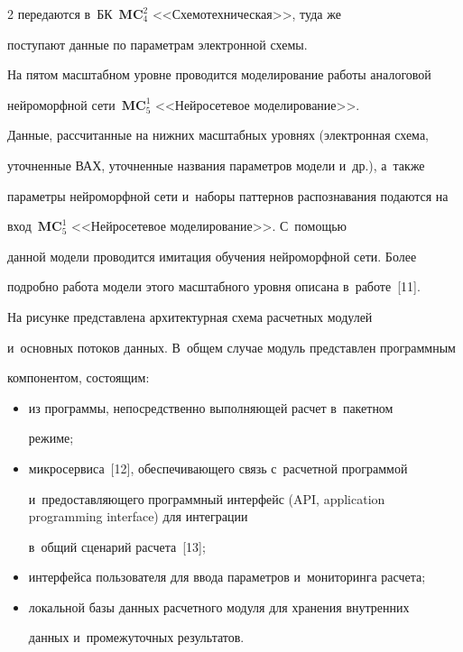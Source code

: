 \begin{multicols}{2}
передаются в~БК~$\mathbf{MC}_4^2$ <<Схемотехническая>>, туда же 


по\-сту\-па\-ют данные по па\-ра\-мет\-рам электронной схемы.


     


     На пятом масштабном уровне проводится моделирование работы аналоговой 


нейроморфной сети~$\mathbf{MC}_5^1$ <<Нейросетевое моделирование>>. 


Данные, рассчитанные на нижних масштабных уровнях (электронная схема, 


уточненные ВАХ, уточненные названия параметров модели и~др.), а~также 


параметры нейроморфной сети и~наборы паттернов распознавания подаются на 


вход~$\mathbf{MC}_5^1$ <<Нейросетевое моделирование>>. С~помощью 


данной модели проводится имитация обучения нейроморфной сети. Более 


подробно работа модели этого масштабного уровня описана в~работе~[11].


    


    На рисунке представлена архитектурная схема расчетных модулей 


и~основных потоков данных. В~общем случае модуль представлен программным 


компонентом, состоящим:


    \begin{itemize}


\item из программы, непосредственно выполняющей расчет в~пакетном 


режиме; 


\item микросервиса~[12], обеспечивающего связь с~расчетной программой 


и~предоставляющего программный интерфейс (API, application programming interface) для интеграции 


в~общий сценарий расчета~[13];


\item интерфейса пользователя для ввода параметров и~мониторинга расчета;


\item локальной базы данных расчетного модуля для хранения внутренних 


данных и~промежуточных результатов.



\end{itemize}
\end{multicols}
